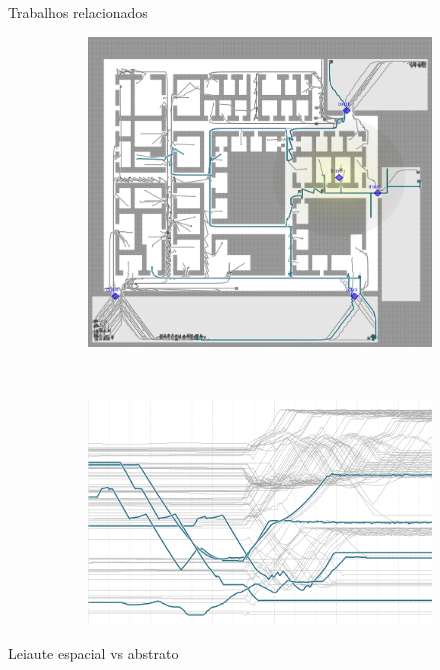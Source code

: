 \begin{frame}{Trabalhos relacionados}
\begin{figure}[ht!]
  \centering
  \begin{subfigure}[t]{0.45\textwidth}
    \centering
    \includegraphics[width=\textwidth]{../figuras/proximidade-espacial.png}
  \end{subfigure}
  ~
  \begin{subfigure}[t]{0.45\textwidth}
    \centering
    \includegraphics[width=\textwidth]{../figuras/proximidade-abstrata.png}
  \end{subfigure}
\end{figure}
  \centering
  Leiaute espacial vs abstrato
\end{frame}

